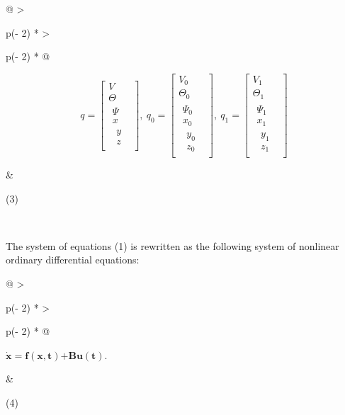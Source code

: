 \begin{longtable}[]{@{}
  >{\raggedright\arraybackslash}p{(\columnwidth - 2\tabcolsep) * }
  >{\raggedright\arraybackslash}p{(\columnwidth - 2\tabcolsep) * }@{}}
\begin{minipage}[b]{\linewidth}\raggedright
\[q = \begin{bmatrix}
V \\
\Theta \\
\begin{matrix}
\Psi \\
x \\
\begin{matrix}
y \\
z
\end{matrix}
\end{matrix}
\end{bmatrix},\ q_{0} = \begin{bmatrix}
V_{0} \\
\Theta_{0} \\
\begin{matrix}
\Psi_{0} \\
x_{0} \\
\begin{matrix}
y_{0} \\
z_{0}
\end{matrix}
\end{matrix}
\end{bmatrix},\ q_{1} = \begin{bmatrix}
V_{1} \\
\Theta_{1} \\
\begin{matrix}
\Psi_{1} \\
x_{1} \\
\begin{matrix}
y_{1} \\
z_{1}
\end{matrix}
\end{matrix}
\end{bmatrix}\]
\end{minipage} & \begin{minipage}[b]{\linewidth}\raggedright
(3)
\end{minipage} \\
\end{longtable}

The system of equations (1) is rewritten as the following system of
nonlinear ordinary differential equations:

\begin{longtable}[]{@{}
  >{\raggedright\arraybackslash}p{(\columnwidth - 2\tabcolsep) * }
  >{\raggedright\arraybackslash}p{(\columnwidth - 2\tabcolsep) * }@{}}

\begin{minipage}[b]{\linewidth}\raggedright
\(\dot{\mathbf{x}}\mathbf{= f}\left( \mathbf{x,t} \right)\mathbf{+ Bu(t)}\).
\end{minipage} & \begin{minipage}[b]{\linewidth}\raggedright
(4)
\end{minipage} \\
\end{longtable}

